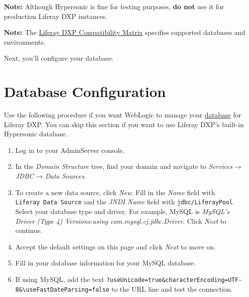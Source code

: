 \noindent\hrulefill

\textbf{Note:} Although Hypersonic is fine for testing purposes,
\textbf{do not} use it for production Liferay DXP instances.

\noindent\hrulefill

\noindent\hrulefill

\textbf{Note:} The
\href{https://web.liferay.com/documents/14/21598941/Liferay+DXP+7.2+Compatibility+Matrix/b6e0f064-db31-49b4-8317-a29d1d76abf7?}{Liferay
DXP Compatibility Matrix} specifies supported databases and
environments.

\noindent\hrulefill

Next, you'll configure your database.

\section{Database Configuration}\label{database-configuration-1}

Use the following procedure if you want WebLogic to manage your
\href{/docs/7-2/deploy/-/knowledge_base/d/preparing-for-install\#using-the-built-in-data-source}{database}
for Liferay DXP. You can skip this section if you want to use Liferay
DXP's built-in Hypersonic database.

\begin{enumerate}
\def\labelenumi{\arabic{enumi}.}
\item
  Log in to your AdminServer console.
\item
  In the \emph{Domain Structure} tree, find your domain and navigate to
  \emph{Services} → \emph{JDBC} → \emph{Data Sources}.
\item
  To create a new data source, click \emph{New}. Fill in the \emph{Name}
  field with \texttt{Liferay\ Data\ Source} and the \emph{JNDI Name}
  field with \texttt{jdbc/LiferayPool}. Select your database type and
  driver. For example, MySQL is \emph{MySQL's Driver (Type 4)
  Versions:using com.mysql.cj.jdbc.Driver}. Click \emph{Next} to
  continue.
\item
  Accept the default settings on this page and click \emph{Next} to move
  on.
\item
  Fill in your database information for your MySQL database.
\item
  If using MySQL, add the text
  \texttt{?useUnicode=true\&characterEncoding=UTF-8\&\textbackslash{}useFastDateParsing=false}
  to the URL line and test the connection.
\end{enumerate}

